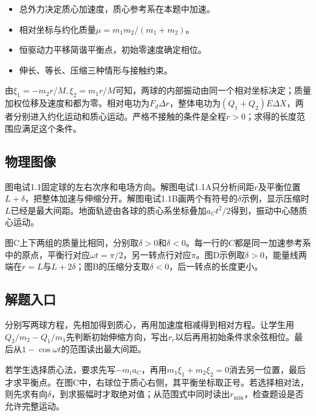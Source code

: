 \documentclass[UTF8,fontset=fandol,a4paper,11pt]{ctexart}
\begin{document}
\begin{itemize}
\item 总外力决定质心加速度，质心参考系在本题中加速。
\item 相对坐标与约化质量$\mu=m_1m_2/(m_1+m_2)$。
\item 恒驱动力平移简谐平衡点，初始零速度确定相位。
\item 伸长、等长、压缩三种情形与接触约束。
\end{itemize}

由$\xi_1=-m_2r/M,\xi_2=m_1r/M$可知，两球的内部振动由同一个相对坐标决定；质量加权位移及速度和都为零。相对电功为$F_d\Delta r$，整体电功为$(Q_1+Q_2)E\Delta X$，两者分别进入约化运动和质心运动。严格不接触的条件是全程$r>0$；求得的长度范围应满足这个条件。



\subsection*{物理图像}

图电试1.1固定球的左右次序和电场方向。解图电试1.1A只分析间距$r$及平衡位置$L+\delta$，把整体加速与伸缩分开。解图电试1.1B画两个有符号的$\delta$示例，显示压缩时$L$已经是最大间距。地面轨迹由各球的质心系坐标叠加$a_Ct^2/2$得到，振动中心随质心运动。

图C上下两组的质量比相同，分别取$\delta>0$和$\delta<0$。每一行的$C$都是同一加速参考系中的原点，平衡行对应$\omega t=\pi/2$，另一转点行对应$\pi$。图D示例取$\delta>0$，能量线两端在$r=L$与$L+2\delta$；图B的压缩分支取$\delta<0$，后一转点的长度更小。



\subsection*{解题入口}

分别写两球方程，先相加得到质心，再用加速度相减得到相对方程。让学生用$Q_2/m_2-Q_1/m_1$先判断初始伸缩方向，写出$r_e$以后再用初始条件求余弦相位。最后从$1-\cos\omega t$的范围读出最大间距。

若学生选择质心法，要求先写$-m_i a_C$，再用$m_1\xi_1+m_2\xi_2=0$消去另一位置，最后才求平衡点。在图C中，右球位于质心右侧，其平衡坐标取正号。若选择相对法，则先求有向$\delta$，到求振幅时才取绝对值；从范围式中同时读出$r_{\min}$，检查题设是否允许完整运动。
\end{document}
